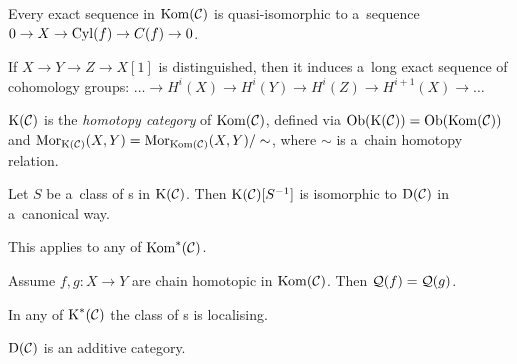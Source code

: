 	\begin{fact}
		Every exact sequence in $\operatorname{Kom}(\mathcal{C})$ is quasi-isomorphic 
		to a~sequence $0 \to X \to \operatorname{Cyl}(f) \to C(f) \to 0$.
	\end{fact}
	
	\begin{fact}
		If $X \to Y \to Z \to X[1]$ is distinguished, then
		it induces a~long exact sequence of cohomology groups:
		$\ldots \to H^i(X) \to H^i(Y) \to H^i(Z) \to H^{i+1}(X) \to \ldots$
	\end{fact}
	
	\begin{definition}
		$\operatorname{K}(\mathcal{C})$ is the \emph{homotopy category} of $\operatorname{Kom}(\mathcal{C})$, defined via
		$\operatorname{Ob}(\operatorname{K}(\mathcal{C})) = \operatorname{Ob}(\operatorname{Kom}(\mathcal{C}))$ and $\operatorname{Mor}_{\operatorname{K}(\mathcal{C})}(X,Y)
		= \operatorname{Mor}_{\operatorname{Kom}(\mathcal{C})}(X,Y)/\sim$,
		where $\sim$ is a~chain homotopy relation.
	\end{definition}
	
	\begin{theorem}
		Let $S$ be a~class of {\qi}s in $\operatorname{K}(\mathcal{C})$. 
		Then $\operatorname{K}(\mathcal{C})[S^{-1}]$ is isomorphic to $\operatorname{D}(\mathcal{C})$ in a~canonical way.
		
		This applies to any of $\operatorname{Kom}^{\ast}(\mathcal{C})$.
	\end{theorem}
	
	\begin{lemma}
		Assume $f, g: X \to Y$ are chain homotopic in $\operatorname{Kom}(\mathcal{C})$.
		Then $\mathcal{Q}(f) = \mathcal{Q}(g)$.
	\end{lemma}
	
	\begin{theorem}
		In any of $\operatorname{K}^\ast(\mathcal{C})$ the class of {\qi}s is localising.
	\end{theorem}
	
	\begin{theorem}
		$\operatorname{D}(\mathcal{C})$ is an additive category.
	\end{theorem}

















 
 

